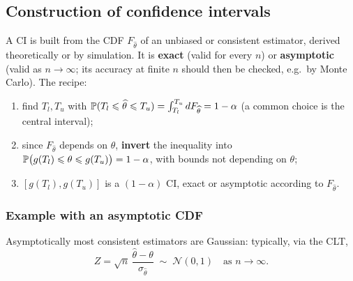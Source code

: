 
\subsection{Construction of confidence intervals}

A CI is built from the CDF $F_{\widehat{\theta}}$ of an unbiased or consistent estimator, derived theoretically or by simulation. It is
\textbf{exact} (valid for every $n$) or \textbf{asymptotic} (valid as $n \to \infty$; its accuracy at finite $n$ should then be checked,
e.g.\ by Monte Carlo). The recipe:
\begin{enumerate}
  \item find $T_l, T_u$ with $\mathbb{P}(T_l \leqslant \widehat{\theta} \leqslant T_u) = \int_{T_l}^{T_u} dF_{\widehat{\theta}} = 1 - \alpha$ (a common choice is the
        central interval);
  \item since $F_{\widehat{\theta}}$ depends on $\theta$, \textbf{invert} the inequality into
        $\mathbb{P}\big(g(T_l) \leqslant \theta \leqslant g(T_u)\big) = 1 - \alpha$, with bounds not depending on $\theta$;
  \item $[g(T_l), g(T_u)]$ is a $(1-\alpha)$ CI, exact or asymptotic according to $F_{\widehat{\theta}}$.
\end{enumerate}

\subsubsection{Example with an asymptotic CDF}

Asymptotically most consistent estimators are Gaussian: typically, via the CLT,
\[
  Z = \sqrt{n}\,\frac{\widehat{\theta} - \theta}{\sigma_{\widehat{\theta}}} \;\sim\; \mathcal{N}(0, 1) \quad\text{as } n \to \infty .
\]


